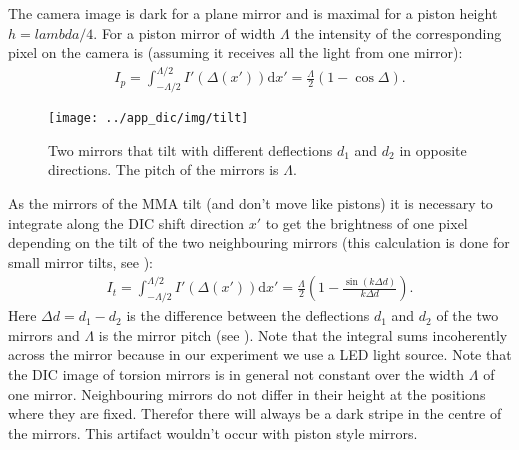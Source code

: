 The camera image is dark for a plane mirror and is maximal for a
piston height $h=lambda/4$.
For a piston mirror of width $\Lambda$ the intensity of the
corresponding pixel on the camera is (assuming it receives all the
light from one mirror):
\begin{align}
  I_p=\int_{-\Lambda/2}^{\Lambda/2} I'(\Delta(x'))\textrm{d}x'=\frac{\Lambda}{2}(1-\cos \Delta).
\end{align}
\begin{figure}[ht]
  \centering
  \texttt{[image: ../app\_dic/img/tilt]}
  \caption{ Two mirrors that tilt with different deflections $d_1$ and
    $d_2$ in opposite directions. The pitch of the mirrors is
    $\Lambda$.}
  \label{fig:tilt}
\end{figure}
As the mirrors of the MMA tilt (and don't move like pistons) it is
necessary to integrate along the DIC shift direction $x'$ to get the
brightness of one pixel depending on the tilt of the two neighbouring
mirrors (this calculation is done for small mirror tilts, see
): 
\begin{align}
\label{eqn:it}
  I_t=\int_{-\Lambda/2}^{\Lambda/2} I'(\Delta(x')) \textrm{d}x'=\frac{\Lambda}{2}\left(1-\frac{\sin(k \Delta d)}{k \Delta d}\right).
\end{align}
Here $\Delta d=d_1-d_2$ is the difference between the deflections
$d_1$ and $d_2$ of the two mirrors and $\Lambda$ is the mirror pitch
(see ). Note that the integral sums incoherently
across the mirror because in our experiment we use a LED light
source. Note that the DIC image of torsion mirrors is in general not
constant over the width $\Lambda$ of one mirror. Neighbouring mirrors
do not differ in their height at the positions where they are
fixed. Therefor there will always be a dark stripe in the centre of
the mirrors. This artifact wouldn't occur with piston style mirrors.

